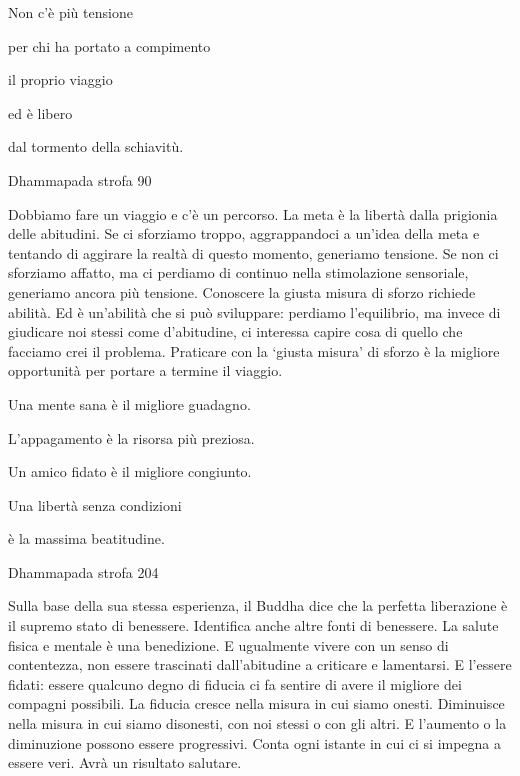 \documentclass[a4paper,portrait,12pt]{article}
\begin{document}
Non c'\`{e} più tensione 


per chi ha portato a compimento


il proprio viaggio


ed \`{e} libero


dal tormento della schiavitù.





Dhammapada strofa 90


\newpage



 Dobbiamo fare un viaggio e c'\`{e} un percorso. La meta \`{e} la libert\`{a} dalla prigionia delle abitudini. Se ci sforziamo troppo, aggrappandoci a un'idea della meta e tentando di aggirare la realt\`{a} di questo momento, generiamo tensione. Se non ci sforziamo affatto, ma ci perdiamo di continuo nella stimolazione sensoriale, generiamo ancora più tensione. Conoscere la giusta misura di sforzo richiede abilit\`{a}. Ed \`{e} un'abilit\`{a} che si pu\`{o} sviluppare: perdiamo l'equilibrio, ma invece di giudicare noi stessi come d'abitudine, ci interessa capire cosa di quello che facciamo crei il problema. Praticare con la `giusta misura' di sforzo \`{e} la migliore opportunit\`{a} per portare a termine il viaggio.


\newpage



Una mente sana \`{e} il migliore guadagno.   


L'appagamento \`{e} la risorsa più preziosa.     


Un amico fidato \`{e} il migliore congiunto.


Una libert\`{a} senza condizioni 


\`{e} la massima beatitudine. 





Dhammapada strofa 204


\newpage



Sulla base della sua stessa esperienza, il Buddha dice che la perfetta liberazione \`{e} il supremo stato di benessere. Identifica anche altre fonti di benessere. La salute fisica e mentale \`{e} una benedizione. E ugualmente vivere con un senso di contentezza, non essere trascinati dall'abitudine a criticare e lamentarsi. E l'essere fidati: essere qualcuno degno di fiducia ci fa sentire di avere il migliore dei compagni possibili. La fiducia cresce nella misura in cui siamo onesti. Diminuisce nella misura in cui siamo disonesti, con noi stessi o con gli altri. E l'aumento o la diminuzione possono essere progressivi. Conta ogni istante in cui ci si impegna a essere veri. Avr\`{a} un risultato salutare.
\end{document}
